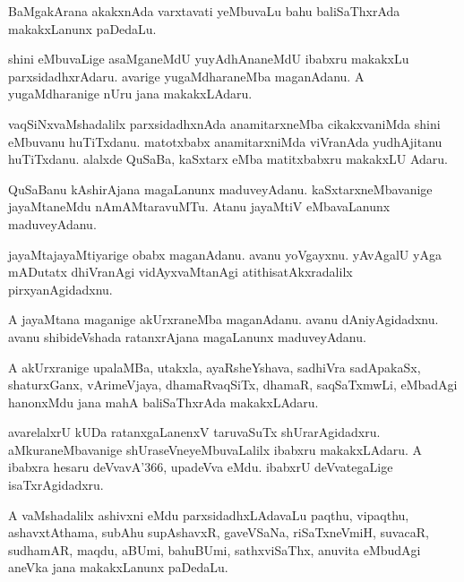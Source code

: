 \documentclass{article}
\begin{document}
\begin{mn}
BaMgakArana akakxnAda varxtavati yeMbuvaLu bahu baliSaThxrAda
makakxLanunx paDedaLu.
\end{mn}

\begin{mn}
shini eMbuvaLige asaMganeMdU yuyAdhAnaneMdU ibabxru makakxLu
parxsidadhxrAdaru. avarige yugaMdharaneMba maganAdanu. A
yugaMdharanige nUru jana makakxLAdaru.
\end{mn}

\begin{mn}%
vaqSiNxvaMshadalilx parxsidadhxnAda anamitarxneMba cikakxvaniMda shini
eMbuvanu huTiTxdanu. matotxbabx anamitarxniMda viVranAda yudhAjitanu
huTiTxdanu. alalxde QuSaBa, kaSxtarx eMba matitxbabxru makakxLU Adaru.
\end{mn}

\begin{mn}
QuSaBanu kAshirAjana magaLanunx maduveyAdanu. kaSxtarxneMbavanige
jayaMtaneMdu nAmAMtaravuMTu. Atanu jayaMtiV eMbavaLanunx maduveyAdanu.
\end{mn}

\begin{mn}%
jayaMtajayaMtiyarige obabx maganAdanu. avanu yoVgayxnu. yAvAgalU yAga
mADutatx dhiVranAgi vidAyxvaMtanAgi atithisatAkxradalilx pirxyanAgidadxnu.
\end{mn}

\begin{mn}
A jayaMtana maganige akUrxraneMba maganAdanu. avanu
dAniyAgidadxnu. avanu shibideVshada ratanxrAjana magaLanunx maduveyAdanu.
\end{mn}

\begin{mn}%
A akUrxranige upalaMBa, utakxla, ayaRsheYshava, sadhiVra sadApakaSx,
shaturxGanx, vArimeVjaya, dhamaRvaqSiTx, dhamaR, saqSaTxmwLi, eMbadAgi
hanonxMdu jana mahA baliSaThxrAda makakxLAdaru.
\end{mn}

\begin{mn}
avarelalxrU kUDa ratanxgaLanenxV taruvaSuTx
shUrarAgidadxru. aMkuraneMbavanige shUraseVneyeMbuvaLalilx ibabxru
makakxLAdaru. A ibabxra hesaru deVvavA\char'366, upadeVva
eMdu. ibabxrU deVvategaLige isaTxrAgidadxru.
\end{mn}

\begin{mn}%
A vaMshadalilx ashivxni eMdu parxsidadhxLAdavaLu paqthu, vipaqthu,
ashavxtAthama, subAhu supAshavxR, gaveVSaNa, riSaTxneVmiH, suvacaR,
sudhamAR, maqdu, aBUmi, bahuBUmi, sathxviSaThx, anuvita eMbudAgi
aneVka jana makakxLanunx paDedaLu.
\end{mn}
\end{document}
